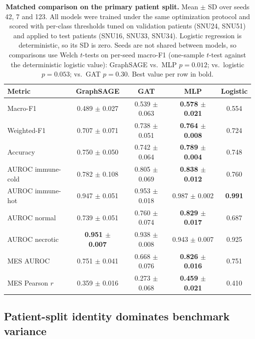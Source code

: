 \documentclass[11pt,letterpaper]{article}
\begin{document}
\begin{table}[H]
\centering
\caption{\textbf{Matched comparison on the primary patient split.} Mean $\pm$ SD over seeds 42, 7 and 123. All models were trained under the same optimization protocol and scored with per-class thresholds tuned on validation patients (SNU24, SNU51) and applied to test patients (SNU16, SNU33, SNU34). Logistic regression is deterministic, so its SD is zero. Seeds are not shared between models, so comparisons use Welch $t$-tests on per-seed macro-F1 (one-sample $t$-test against the deterministic logistic value): GraphSAGE vs.\ MLP $p = 0.012$; vs.\ logistic $p = 0.053$; vs.\ GAT $p = 0.30$. Best value per row in bold.}
\label{tab:comparison}
\small
\begin{tabular}{lcccc}
\toprule
\textbf{Metric} & \textbf{GraphSAGE} & \textbf{GAT} & \textbf{MLP} & \textbf{Logistic} \\
\midrule
Macro-F1            & 0.489 $\pm$ 0.027 & 0.539 $\pm$ 0.063 & \textbf{0.578 $\pm$ 0.021} & 0.554 \\
Weighted-F1         & 0.707 $\pm$ 0.071 & 0.738 $\pm$ 0.051 & \textbf{0.764 $\pm$ 0.008} & 0.724 \\
Accuracy            & 0.750 $\pm$ 0.050 & 0.742 $\pm$ 0.064 & \textbf{0.789 $\pm$ 0.004} & 0.748 \\
AUROC immune-cold   & 0.782 $\pm$ 0.108 & 0.805 $\pm$ 0.069 & \textbf{0.838 $\pm$ 0.012} & 0.760 \\
AUROC immune-hot    & 0.947 $\pm$ 0.051 & 0.953 $\pm$ 0.018 & 0.987 $\pm$ 0.002 & \textbf{0.991} \\
AUROC normal        & 0.739 $\pm$ 0.051 & 0.760 $\pm$ 0.074 & \textbf{0.829 $\pm$ 0.017} & 0.687 \\
AUROC necrotic      & \textbf{0.951 $\pm$ 0.007} & 0.938 $\pm$ 0.008 & 0.943 $\pm$ 0.007 & 0.925 \\
MES AUROC           & 0.751 $\pm$ 0.041 & 0.668 $\pm$ 0.076 & \textbf{0.826 $\pm$ 0.016} & 0.751 \\
MES Pearson $r$     & 0.359 $\pm$ 0.016 & 0.273 $\pm$ 0.068 & \textbf{0.459 $\pm$ 0.021} & 0.410 \\
\bottomrule
\end{tabular}
\end{table}

\subsection{Patient-split identity dominates benchmark variance}
\end{document}
